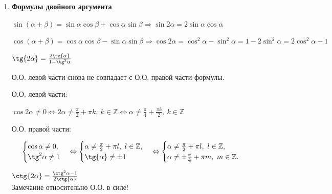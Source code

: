 \documentclass{article}
\begin{document}
        \begin{enumerate}
        	\item \textbf{Формулы двойного аргумента}
            
            \(\sin{(\alpha + \beta)} = \sin{\alpha}\cos{\beta} + \cos{\alpha}\sin{\beta} \Rightarrow \sin{2\alpha} = 2\sin{\alpha}\cos{\alpha}\)
            
            \(\cos{(\alpha + \beta)} = \cos{\alpha}\cos{\beta} - \sin{\alpha}\sin{\beta} \Rightarrow \cos{2\alpha} = \cos^2{\alpha} - \sin^2{\alpha} = 1 - 2\sin^2{\alpha} = 2\cos^2{\alpha} - 1\)
            
            \(\tg{2\alpha} = \frac{2\tg{\alpha}}{1 - \tg^2{\alpha}}\)
            
            О.О. левой части снова не совпадает с О.О. правой части формулы.
            
            О.О. левой части:
            
            \(\cos{2\alpha} \not = 0 \Leftrightarrow 2\alpha \not = \frac{\pi}{2} + \pi k,\ k \in \mathbb{Z} \Leftrightarrow \alpha \not = \frac{\pi}{4} + \frac{\pi k}{2},\ k \in \mathbb{Z}\)
            
            О.О. правой части:
            
            \begin{equation}
                \begin{cases}
                    \cos{\alpha} \not = 0,\\
                    \tg^2{\alpha} \not = 1
                \end{cases}\Leftrightarrow
                \begin{cases}
                    \alpha \not = \frac{\pi}{2} + \pi l,\ l \in \mathbb{Z},\\
                    \tg{\alpha} \not = \pm 1
                \end{cases}\Leftrightarrow
                \begin{cases}
                    \alpha \not = \frac{\pi}{2} + \pi l,\ l \in \mathbb{Z},\\
                    \alpha \not = \pm \frac{\pi}{4} + \pi m,\ m \in \mathbb{Z}.
                \end{cases}
            \end{equation}
            
            \(\ctg{2\alpha} = \frac{\ctg^2{\alpha} - 1}{2\ctg{\alpha}}\)
            \\Замечание относительно О.О. в силе!
            

\end{enumerate}
\end{document}
